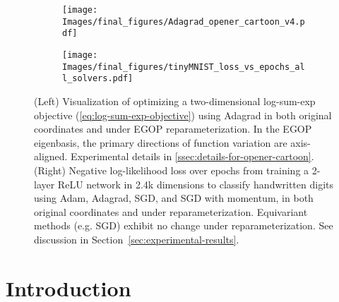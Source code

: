 \documentclass{article}
\begin{document}
\begin{figure*}
    \centering
    \begin{subfigure}[c]{0.58\textwidth}
        \centering
        \texttt{[image: Images/final\_figures/Adagrad\_opener\_cartoon\_v4.pdf]}
    \end{subfigure}
    \hspace{0.01\textwidth} %
    \begin{subfigure}[c]{0.38\textwidth} %
        \centering
        \texttt{[image: Images/final\_figures/tinyMNIST\_loss\_vs\_epochs\_all\_solvers.pdf]}
    \end{subfigure}
    \caption{(Left) Visualization of optimizing a two-dimensional log-sum-exp objective  (\ref{eq:log-sum-exp-objective}) using Adagrad in both original coordinates and under EGOP reparameterization.  In the EGOP eigenbasis, the primary directions of function variation are axis-aligned. Experimental details in \cref{ssec:details-for-opener-cartoon}. (Right) Negative log-likelihood loss over epochs from training a 2-layer ReLU network in 2.4k dimensions to classify handwritten digits using Adam, Adagrad, SGD, and SGD with momentum, in both original coordinates and under reparameterization. Equivariant methods (e.g. SGD) exhibit no change under reparameterization. See discussion in Section~\ref{sec:experimental-results}.}\label{fig:opener-cartoon}
\end{figure*}

\section{Introduction}\label{sec:intro}
\end{document}
